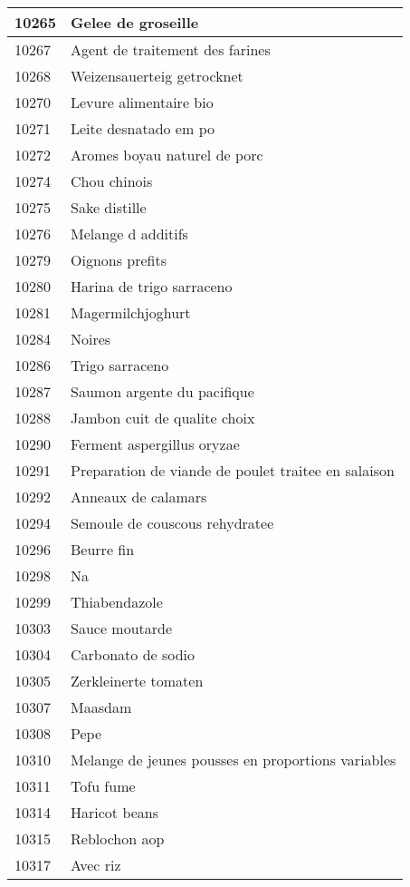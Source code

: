 \begin{longtable}{|l|l|}
10265 & Gelee de groseille \\ \hline 
10267 & Agent de traitement des farines \\ \hline 
10268 & Weizensauerteig getrocknet \\ \hline 
10270 & Levure alimentaire bio \\ \hline 
10271 & Leite desnatado em po \\ \hline 
10272 & Aromes boyau naturel de porc \\ \hline 
10274 & Chou chinois \\ \hline 
10275 & Sake distille \\ \hline 
10276 & Melange d additifs \\ \hline 
10279 & Oignons prefits \\ \hline 
10280 & Harina de trigo sarraceno \\ \hline 
10281 & Magermilchjoghurt \\ \hline 
10284 & Noires \\ \hline 
10286 & Trigo sarraceno \\ \hline 
10287 & Saumon argente du pacifique \\ \hline 
10288 & Jambon cuit de qualite choix \\ \hline 
10290 & Ferment aspergillus oryzae \\ \hline 
10291 & Preparation de viande de poulet traitee en salaison \\ \hline 
10292 & Anneaux de calamars \\ \hline 
10294 & Semoule de couscous rehydratee \\ \hline 
10296 & Beurre fin \\ \hline 
10298 & Na \\ \hline 
10299 & Thiabendazole \\ \hline 
10303 & Sauce moutarde \\ \hline 
10304 & Carbonato de sodio \\ \hline 
10305 & Zerkleinerte tomaten \\ \hline 
10307 & Maasdam \\ \hline 
10308 & Pepe \\ \hline 
10310 & Melange de jeunes pousses en proportions variables \\ \hline 
10311 & Tofu fume \\ \hline 
10314 & Haricot beans \\ \hline 
10315 & Reblochon aop \\ \hline 
10317 & Avec riz \\ \hline 

\end{longtable}
